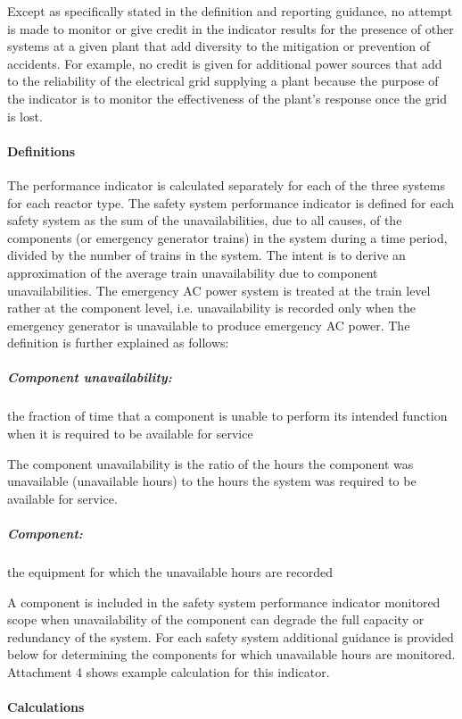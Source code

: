 Except as specifically stated in the definition and reporting
guidance, no attempt is made to monitor or give credit in the
indicator results for the presence of other systems at a given plant
that add diversity to the mitigation or prevention of accidents. For
example, no credit is given for additional power sources that add to
the reliability of the electrical grid supplying a plant because the
purpose of the indicator is to monitor the effectiveness of the
plant's response once the grid is lost.

\paragraph{Definitions}

The performance indicator is calculated separately for each of the
three systems for each reactor type. The safety system performance
indicator is defined for each safety system as the sum of the
unavailabilities, due to all causes, of the components (or emergency
generator trains) in the system during a time period, divided by the
number of trains in the system. The intent is to derive an
approximation of the average train unavailability due to component
unavailabilities. The emergency AC power system is treated at the
train level rather at the component level, i.e. unavailability is
recorded only when the emergency generator is unavailable to produce
emergency AC power. The definition is further explained as follows:

\subparagraph{Component unavailability:} the fraction of time that a
component is unable to perform its intended function when it is
required to be available for service

The component unavailability is the ratio of the hours the component
was unavailable (unavailable hours) to the hours the system was
required to be available for service.

\subparagraph{Component:} the equipment for which the unavailable
hours are recorded

A component is included in the safety system performance indicator
monitored scope when unavailability of the component can degrade the
full capacity or redundancy of the system. For each safety system
additional guidance is provided below for determining the components
for which unavailable hours are monitored. Attachment 4 shows example
calculation for this indicator.

\paragraph{Calculations}

